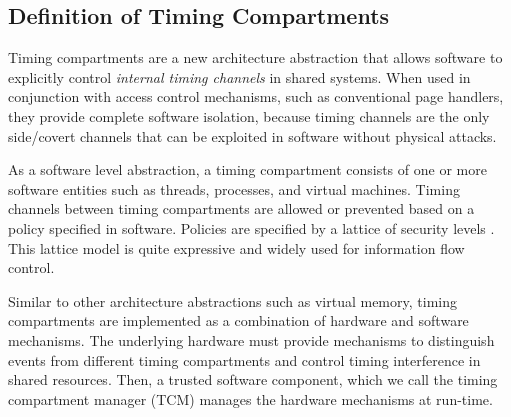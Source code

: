 \subsection{Definition of Timing Compartments}

Timing compartments are a new architecture abstraction that allows software to
explicitly control {\em internal timing channels} in shared systems.
When used in conjunction with access
control mechanisms, such as conventional page handlers, they provide complete software 
isolation, because timing channels are the only side/covert channels that can be
exploited in software without physical attacks.

As a software level abstraction, a timing compartment consists of one or more 
software entities such as threads, processes, and virtual machines.  Timing 
channels between timing compartments are allowed or prevented based on a policy 
specified in software.  Policies are specified by a lattice of security levels
\cite{denning}.
This lattice model is quite expressive and widely used for information flow 
control. 


Similar to other architecture abstractions such as virtual memory,
timing compartments are implemented as a combination of hardware and software
mechanisms. The underlying hardware must provide mechanisms to distinguish
events from different timing compartments and control timing interference in 
shared resources. Then, a trusted software component, which we call the timing 
compartment manager (TCM) manages the hardware mechanisms at run-time.

